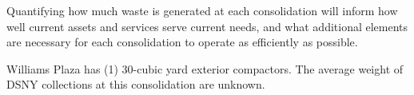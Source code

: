 
    Quantifying how much waste is generated at each consolidation will inform how well current assets and services serve current needs, and what additional elements are necessary for each consolidation to operate as efficiently as possible.
    
    Williams Plaza has (1) 30-cubic yard exterior compactors. The average weight of DSNY collections at this consolidation are unknown.